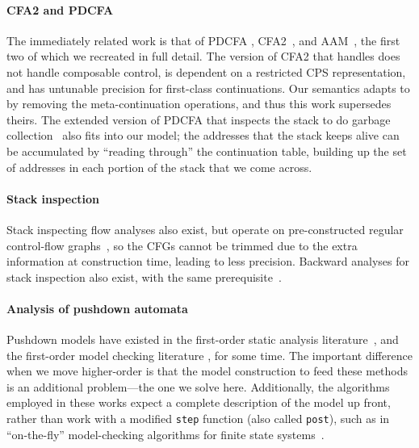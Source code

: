 \paragraph{CFA2 and PDCFA}
The immediately related work is that of PDCFA \citep{dvanhorn:Earl2010Pushdown, dvanhorn:Earl2012Introspective}, CFA2~\citep{ianjohnson:vardoulakis-lmcs11, ianjohnson:Vardoulakis2011Pushdown}, and AAM~\citep{dvanhorn:VanHorn2010Abstracting}, the first two of which we recreated in full detail.
%
The version of CFA2 that handles  does not handle composable control, is dependent on a restricted CPS representation, and has untunable precision for first-class continuations.
%
Our semantics adapts to  by removing the meta-continuation operations, and thus this work supersedes theirs.
%
The extended version of PDCFA that inspects the stack to do garbage collection~\citep{dvanhorn:Earl2012Introspective} also fits into our model;
the addresses that the stack keeps alive can be accumulated by ``reading through'' the continuation table, building up the set of addresses in each portion of the stack that we come across.

\paragraph{Stack inspection}
Stack inspecting flow analyses also exist, but operate on pre-constructed regular control-flow graphs~\citep{ianjohnson:bartoletti2004stack}, so the CFGs cannot be trimmed due to the extra information at construction time, leading to less precision.
%
Backward analyses for stack inspection also exist, with the same prerequisite~\citep{ianjohnson:DBLP:journals/sigplan/Chang06}.

\paragraph{Analysis of pushdown automata}
Pushdown models have existed in the first-order static analysis literature~\citep[Chapter 7]{local:muchnick:jones:flow-analysis:1981}\citep{ianjohnson:reps:pushdown:1995}, and the first-order model checking literature \citep{ianjohnson:bouajiani:esparza:pushdown:1997}, for some time.
%
The important difference when we move higher-order is that the model construction to feed these methods is an additional problem---the one we solve here.
%
Additionally, the algorithms employed in these works expect a complete description of the model up front, rather than work with a modified \texttt{step} function (also called \texttt{post}), such as in ``on-the-fly'' model-checking algorithms for finite state systems~\citep{DBLP:conf/tacas/SchwoonE05}.

